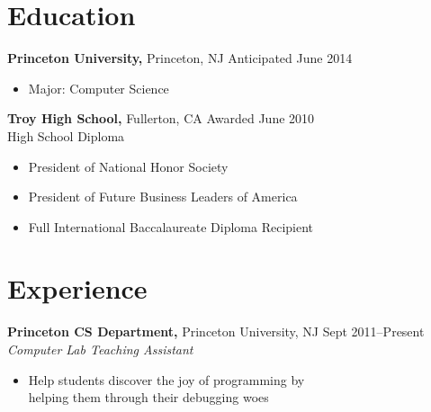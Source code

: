 \documentclass[margin]{res}
\begin{document}

\address{{\bf Present Address} \\ 3169 Frist Center \\ Princeton, NJ
  08544 \\ http://dskang.com \\ dan@dskang.com }

\address{{\bf Permanent Address} \\ 2507 Cypress Point Drive \\
  Fullerton, CA 92833 }


\begin{resume}

\section{Education}
 {\bf Princeton University,} Princeton, NJ \hfill Anticipated June
 2014
 \begin{itemize} \itemsep -2pt %
 \item Major: Computer Science
 \end{itemize}

 {\bf Troy High School,} Fullerton, CA \hfill Awarded June 2010 \\
 High School Diploma
 \begin{itemize} \itemsep -2pt %
 \item President of National Honor Society
 \item President of Future Business Leaders of America
 \item Full International Baccalaureate Diploma Recipient
 \end{itemize}

\section{Experience}
 {\bf Princeton CS Department,} Princeton University, NJ \hfill Sept 2011--Present \\
 {\it Computer Lab Teaching Assistant}
 \begin{itemize} \itemsep -2pt  %
 \item Help students discover the joy of programming by \\
   helping them through their debugging woes
 \end{itemize}


\end{resume}
\end{document}
